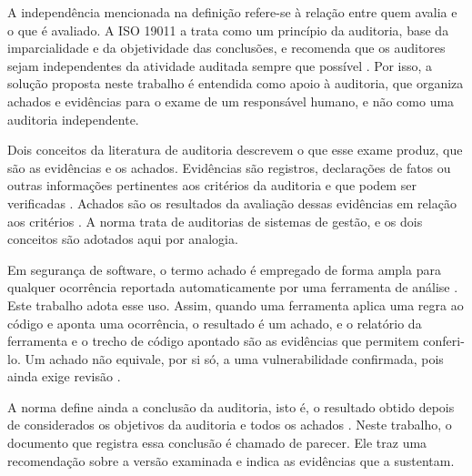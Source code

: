 A independência mencionada na definição refere-se à relação entre quem avalia e o que é avaliado. A ISO 19011 a trata como um princípio da auditoria, base da imparcialidade e da objetividade das conclusões, e recomenda que os auditores sejam independentes da atividade auditada sempre que possível \cite[item 4.6]{iso19011}. Por isso, a solução proposta neste trabalho é entendida como apoio à auditoria, que organiza achados e evidências para o exame de um responsável humano, e não como uma auditoria independente.

Dois conceitos da literatura de auditoria descrevem o que esse exame produz, que são as evidências e os achados. Evidências são registros, declarações de fatos ou outras informações pertinentes aos critérios da auditoria e que podem ser verificadas \cite[item 3.10]{iso19011}. Achados são os resultados da avaliação dessas evidências em relação aos critérios \cite[item 3.11]{iso19011}. A norma trata de auditorias de sistemas de gestão, e os dois conceitos são adotados aqui por analogia.

Em segurança de software, o termo achado é empregado de forma ampla para qualquer ocorrência reportada automaticamente por uma ferramenta de análise \cite{oliveira2026}. Este trabalho adota esse uso. Assim, quando uma ferramenta aplica uma regra ao código e aponta uma ocorrência, o resultado é um achado, e o relatório da ferramenta e o trecho de código apontado são as evidências que permitem conferi-lo. Um achado não equivale, por si só, a uma vulnerabilidade confirmada, pois ainda exige revisão \cite{oliveira2026}.

A norma define ainda a conclusão da auditoria, isto é, o resultado obtido depois de considerados os objetivos da auditoria e todos os achados \cite[item 3.12]{iso19011}. %
Neste trabalho, o documento que registra essa conclusão é chamado de parecer. Ele traz uma recomendação sobre a versão examinada e indica as evidências que a sustentam.

